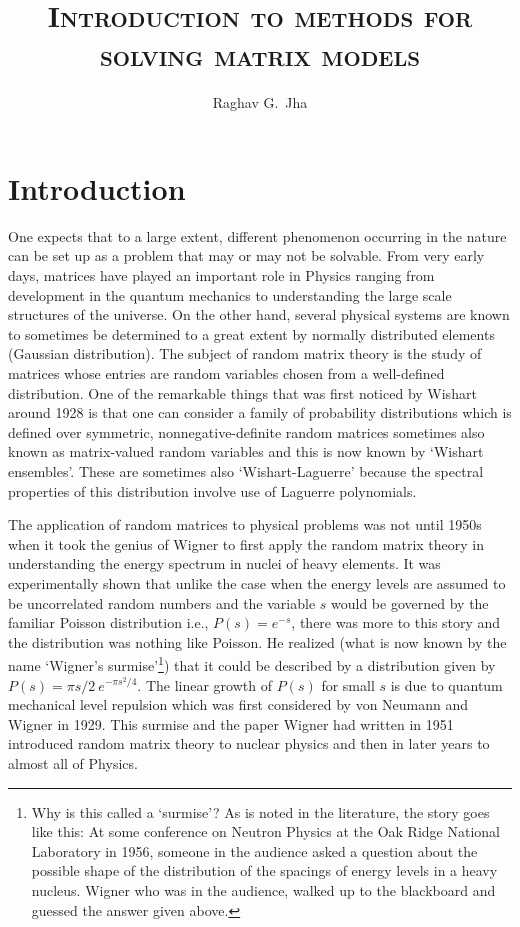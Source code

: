 \documentclass[11pt]{article}
\title{\textsc{Introduction to methods for solving matrix models}}
\author[a]{Raghav G.~Jha}
\affiliation{Perimeter Institute for Theoretical Physics, Waterloo, Ontario N2L 2Y5, Canada}
\begin{document}
\date{}
\maketitle

\section{Introduction}

One expects that to a large extent, different phenomenon occurring in the nature 
can be set up as a problem that may or may not be solvable. From very early days, matrices have played an important role in Physics ranging from development in the quantum mechanics to understanding the large scale structures of the universe. On the other hand, several physical systems are known to sometimes be determined to a great extent by normally distributed elements (Gaussian distribution). The subject of random matrix theory is the study of matrices whose entries are random variables chosen from a well-defined distribution. One of the remarkable things that was first noticed by Wishart around 1928 is that one can consider a family of probability distributions which is defined over symmetric, nonnegative-definite random matrices sometimes also known as matrix-valued random variables and this is now known by `Wishart ensembles'. These are sometimes also `Wishart-Laguerre' because the spectral properties of this distribution involve use of Laguerre polynomials. 

The application of random matrices to physical problems was not until 1950s
when it took the genius of Wigner to first apply the random matrix theory 
in understanding the energy spectrum in nuclei of heavy elements. It was experimentally 
shown that unlike the case when the energy levels are assumed to be uncorrelated
random numbers and the variable $s$ would be governed by the familiar Poisson distribution i.e., $P(s) = e^{-s}$, there was more to this story and the distribution was nothing like Poisson. He realized (what is now known by the name `Wigner's surmise'\footnote{Why is this called a `surmise'? 
As is noted in the literature, the story goes like this: At some conference on Neutron Physics at the Oak 
Ridge National Laboratory in 1956, someone in the audience asked a question about the possible shape 
of the distribution of the spacings of energy levels in a heavy nucleus. Wigner who was in the audience, walked up to the blackboard and guessed the answer given above.}) that it could be described by a distribution given by $P(s) = \pi s/2~e^{-\pi s^2/4}$. 
The linear growth of $P(s)$ for small $s$ is due to quantum mechanical level repulsion which was first considered by von Neumann and Wigner in 1929. This surmise and the paper Wigner had written in 1951 \cite{Wigner1951OnTS} introduced random matrix theory to nuclear physics and then in later years to almost all of Physics.
\end{document}
